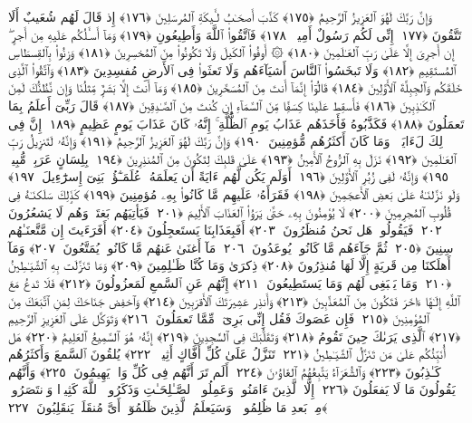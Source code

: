  وَإِنَّ رَبَّكَ لَهُوَ ٱلعَزِيزُ ٱلرَّحِيمُ ﴿١٧٥﴾
 كَذَّبَ أَصحَـٰبُ لـَٔيكَةِ ٱلمُرسَلِينَ ﴿١٧٦﴾
 إِذ قَالَ لَهُم شُعَيبٌ أَلَا تَتَّقُونَ ﴿١٧٧﴾
 إِنِّى لَكُم رَسُولٌ أَمِينٌۭ ﴿١٧٨﴾
 فَٱتَّقُوا۟ ٱللَّهَ وَأَطِيعُونِ ﴿١٧٩﴾
 وَمَآ أَسـَٔلُكُم عَلَيهِ مِن أَجرٍ ۖ إِن أَجرِىَ إِلَّا عَلَىٰ رَبِّ ٱلعَـٰلَمِينَ ﴿١٨٠﴾
 ۞ أَوفُوا۟ ٱلكَيلَ وَلَا تَكُونُوا۟ مِنَ ٱلمُخسِرِينَ ﴿١٨١﴾
 وَزِنُوا۟ بِٱلقِسطَاسِ ٱلمُستَقِيمِ ﴿١٨٢﴾
 وَلَا تَبخَسُوا۟ ٱلنَّاسَ أَشيَآءَهُم وَلَا تَعثَوا۟ فِى ٱلأَرضِ مُفسِدِينَ ﴿١٨٣﴾
 وَٱتَّقُوا۟ ٱلَّذِى خَلَقَكُم وَٱلجِبِلَّةَ ٱلأَوَّلِينَ ﴿١٨٤﴾
 قَالُوٓا۟ إِنَّمَآ أَنتَ مِنَ ٱلمُسَحَّرِينَ ﴿١٨٥﴾
 وَمَآ أَنتَ إِلَّا بَشَرٌۭ مِّثلُنَا وَإِن نَّظُنُّكَ لَمِنَ ٱلكَـٰذِبِينَ ﴿١٨٦﴾
 فَأَسقِط عَلَينَا كِسَفًۭا مِّنَ ٱلسَّمَآءِ إِن كُنتَ مِنَ ٱلصَّـٰدِقِينَ ﴿١٨٧﴾
 قَالَ رَبِّىٓ أَعلَمُ بِمَا تَعمَلُونَ ﴿١٨٨﴾
 فَكَذَّبُوهُ فَأَخَذَهُم عَذَابُ يَومِ ٱلظُّلَّةِ ۚ إِنَّهُۥ كَانَ عَذَابَ يَومٍ عَظِيمٍ ﴿١٨٩﴾
 إِنَّ فِى ذَٟلِكَ لَءَايَةًۭ ۖ وَمَا كَانَ أَكثَرُهُم مُّؤمِنِينَ ﴿١٩٠﴾
 وَإِنَّ رَبَّكَ لَهُوَ ٱلعَزِيزُ ٱلرَّحِيمُ ﴿١٩١﴾
 وَإِنَّهُۥ لَتَنزِيلُ رَبِّ ٱلعَـٰلَمِينَ ﴿١٩٢﴾
 نَزَلَ بِهِ ٱلرُّوحُ ٱلأَمِينُ ﴿١٩٣﴾
 عَلَىٰ قَلبِكَ لِتَكُونَ مِنَ ٱلمُنذِرِينَ ﴿١٩٤﴾
 بِلِسَانٍ عَرَبِىٍّۢ مُّبِينٍۢ ﴿١٩٥﴾
 وَإِنَّهُۥ لَفِى زُبُرِ ٱلأَوَّلِينَ ﴿١٩٦﴾
 أَوَلَم يَكُن لَّهُم ءَايَةً أَن يَعلَمَهُۥ عُلَمَـٰٓؤُا۟ بَنِىٓ إِسرَٰٓءِيلَ ﴿١٩٧﴾
 وَلَو نَزَّلنَـٰهُ عَلَىٰ بَعضِ ٱلأَعجَمِينَ ﴿١٩٨﴾
 فَقَرَأَهُۥ عَلَيهِم مَّا كَانُوا۟ بِهِۦ مُؤمِنِينَ ﴿١٩٩﴾
 كَذَٟلِكَ سَلَكنَـٰهُ فِى قُلُوبِ ٱلمُجرِمِينَ ﴿٢٠٠﴾
 لَا يُؤمِنُونَ بِهِۦ حَتَّىٰ يَرَوُا۟ ٱلعَذَابَ ٱلأَلِيمَ ﴿٢٠١﴾
 فَيَأتِيَهُم بَغتَةًۭ وَهُم لَا يَشعُرُونَ ﴿٢٠٢﴾
 فَيَقُولُوا۟ هَل نَحنُ مُنظَرُونَ ﴿٢٠٣﴾
 أَفَبِعَذَابِنَا يَستَعجِلُونَ ﴿٢٠٤﴾
 أَفَرَءَيتَ إِن مَّتَّعنَـٰهُم سِنِينَ ﴿٢٠٥﴾
 ثُمَّ جَآءَهُم مَّا كَانُوا۟ يُوعَدُونَ ﴿٢٠٦﴾
 مَآ أَغنَىٰ عَنهُم مَّا كَانُوا۟ يُمَتَّعُونَ ﴿٢٠٧﴾
 وَمَآ أَهلَكنَا مِن قَريَةٍ إِلَّا لَهَا مُنذِرُونَ ﴿٢٠٨﴾
 ذِكرَىٰ وَمَا كُنَّا ظَـٰلِمِينَ ﴿٢٠٩﴾
 وَمَا تَنَزَّلَت بِهِ ٱلشَّيَـٰطِينُ ﴿٢١٠﴾
 وَمَا يَنۢبَغِى لَهُم وَمَا يَستَطِيعُونَ ﴿٢١١﴾
 إِنَّهُم عَنِ ٱلسَّمعِ لَمَعزُولُونَ ﴿٢١٢﴾
 فَلَا تَدعُ مَعَ ٱللَّهِ إِلَـٰهًا ءَاخَرَ فَتَكُونَ مِنَ ٱلمُعَذَّبِينَ ﴿٢١٣﴾
 وَأَنذِر عَشِيرَتَكَ ٱلأَقرَبِينَ ﴿٢١٤﴾
 وَٱخفِض جَنَاحَكَ لِمَنِ ٱتَّبَعَكَ مِنَ ٱلمُؤمِنِينَ ﴿٢١٥﴾
 فَإِن عَصَوكَ فَقُل إِنِّى بَرِىٓءٌۭ مِّمَّا تَعمَلُونَ ﴿٢١٦﴾
 وَتَوَكَّل عَلَى ٱلعَزِيزِ ٱلرَّحِيمِ ﴿٢١٧﴾
 ٱلَّذِى يَرَىٰكَ حِينَ تَقُومُ ﴿٢١٨﴾
 وَتَقَلُّبَكَ فِى ٱلسَّٰجِدِينَ ﴿٢١٩﴾
 إِنَّهُۥ هُوَ ٱلسَّمِيعُ ٱلعَلِيمُ ﴿٢٢٠﴾
 هَل أُنَبِّئُكُم عَلَىٰ مَن تَنَزَّلُ ٱلشَّيَـٰطِينُ ﴿٢٢١﴾
 تَنَزَّلُ عَلَىٰ كُلِّ أَفَّاكٍ أَثِيمٍۢ ﴿٢٢٢﴾
 يُلقُونَ ٱلسَّمعَ وَأَكثَرُهُم كَـٰذِبُونَ ﴿٢٢٣﴾
 وَٱلشُّعَرَآءُ يَتَّبِعُهُمُ ٱلغَاوُۥنَ ﴿٢٢٤﴾
 أَلَم تَرَ أَنَّهُم فِى كُلِّ وَادٍۢ يَهِيمُونَ ﴿٢٢٥﴾
 وَأَنَّهُم يَقُولُونَ مَا لَا يَفعَلُونَ ﴿٢٢٦﴾
 إِلَّا ٱلَّذِينَ ءَامَنُوا۟ وَعَمِلُوا۟ ٱلصَّـٰلِحَـٰتِ وَذَكَرُوا۟ ٱللَّهَ كَثِيرًۭا وَٱنتَصَرُوا۟ مِنۢ بَعدِ مَا ظُلِمُوا۟ ۗ وَسَيَعلَمُ ٱلَّذِينَ ظَلَمُوٓا۟ أَىَّ مُنقَلَبٍۢ يَنقَلِبُونَ ﴿٢٢٧﴾
 
